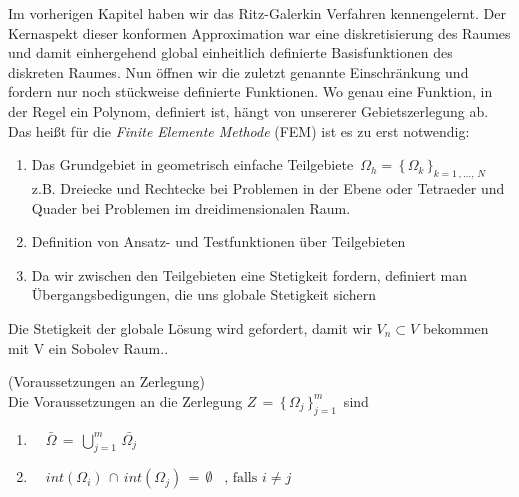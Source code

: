 Im vorherigen Kapitel haben wir das Ritz-Galerkin Verfahren kennengelernt. Der Kernaspekt dieser konformen Approximation war eine diskretisierung des Raumes und damit einhergehend global einheitlich definierte Basisfunktionen des diskreten Raumes. Nun öffnen wir die zuletzt genannte Einschränkung und fordern nur noch stückweise definierte Funktionen. Wo genau eine Funktion, in der Regel ein Polynom, definiert ist, hängt von unsererer Gebietszerlegung ab.
Das heißt für die \textit{Finite Elemente Methode} (FEM) ist es zu erst notwendig:
\begin{enumerate}
\item Das Grundgebiet in geometrisch einfache Teilgebiete $ \, \Omega_h = \, \{ \, \Omega_k \, \}_{k=1 \, , \dots, \, N} \, $ z.B. Dreiecke und Rechtecke bei Problemen in der Ebene oder Tetraeder und Quader bei Problemen im dreidimensionalen Raum.
\item Definition von Ansatz- und Testfunktionen über Teilgebieten 
\item Da wir zwischen den Teilgebieten eine Stetigkeit fordern, definiert man Übergangsbedigungen, die uns globale Stetigkeit sichern
\end{enumerate}
Die Stetigkeit der globale Lösung wird gefordert, damit wir $V_n \subset V$ bekommen mit V ein Sobolev Raum.\cite[175]{Numerik}. 


\begin{Bemerkung} (Voraussetzungen an Zerlegung) \cite[176]{Numerik} \\
Die Voraussetzungen an die Zerlegung $Z \, = \, \{  \, \Omega_j  \, \}_{j=1}^{m} \, $ sind 
\begin{enumerate}
\item \, \, $\bar{\Omega} \, = \,  \bigcup\limits_{j=1}^{m} \, \bar{\Omega_j}  $
\item  \, \, $int (\Omega_i) \, \cap \, int (\Omega_j) \, = \,  \emptyset  \, \, \, \text{ , falls } i \neq j $
\end{enumerate}
\end{Bemerkung}

